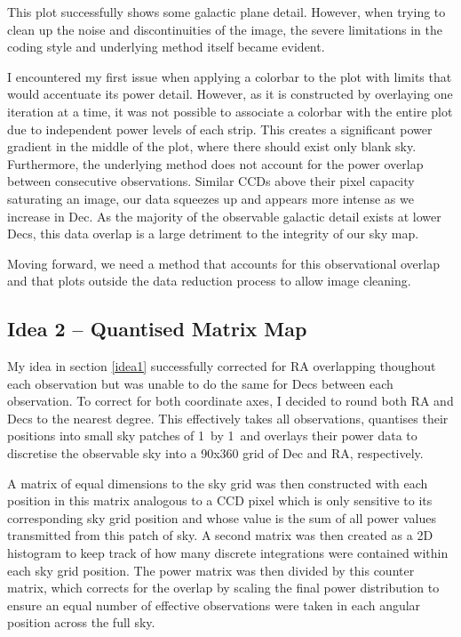 \documentclass[11pt]{article} %
\begin{document}
This plot successfully shows some galactic plane detail. However, when trying to clean up the noise and discontinuities of the image, the severe limitations in the coding style and underlying method itself became evident.

I encountered my first issue when applying a colorbar to the plot with limits that would accentuate its power detail. However, as it is constructed by overlaying one iteration at a time, it was not possible to associate a colorbar with the entire plot due to independent power levels of each strip. This creates a significant power gradient in the middle of the plot, where there should exist only blank sky. Furthermore, the underlying method does not account for the power overlap between consecutive observations. Similar CCDs above their pixel capacity saturating an image, our data squeezes up and appears more intense as we increase in Dec. As the majority of the observable galactic detail exists at lower Decs, this data overlap is a large detriment to the integrity of our sky map.

Moving forward, we need a method that accounts for this observational overlap and that plots outside the data reduction process to allow image cleaning.

\subsection{Idea 2 -- Quantised Matrix Map} \label{idea2}

My idea in section \ref{idea1} successfully corrected for RA overlapping thoughout each observation but was unable to do the same for Decs between each observation. To correct for both coordinate axes, I decided to round both RA and Decs to the nearest degree. This effectively takes all observations, quantises their positions into small sky patches of 1\degree~by 1\degree~and overlays their power data to discretise the observable sky into a 90x360 grid of Dec and RA, respectively. 

A matrix of equal dimensions to the sky grid was then constructed with each position in this matrix analogous to a CCD pixel which is only sensitive to its corresponding sky grid position and whose value is the sum of all power values transmitted from this patch of sky. A second matrix was then created as a 2D histogram to keep track of how many discrete integrations were contained within each sky grid position. The power matrix was then divided by this counter matrix, which corrects for the overlap by scaling the final power distribution to ensure an equal number of effective observations were taken in each angular position across the full sky.
\end{document}
